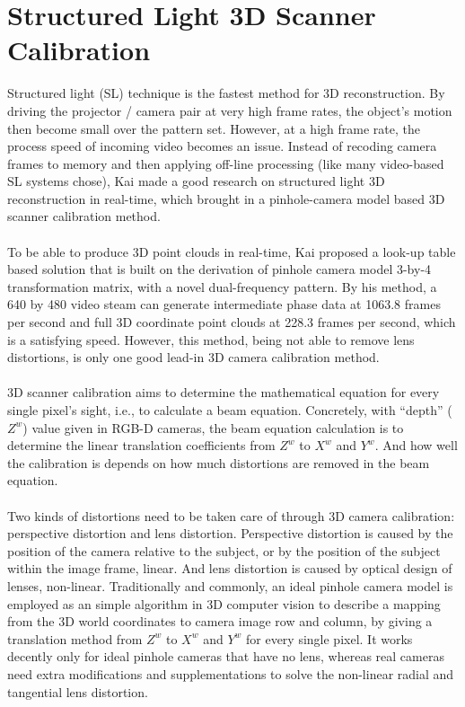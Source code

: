 \section{Structured Light 3D Scanner Calibration} %
\label{sectionSL3DCalibration} %
Structured light (SL) technique is the fastest method for 3D reconstruction. By driving the projector / camera pair at very high frame rates, the object's motion then become small over the pattern set. However, at a high frame rate, the process speed of incoming video becomes an issue. Instead of recoding camera frames to memory and then applying off-line processing (like many video-based SL systems chose), Kai \cite{Kai10} made a good research on structured light 3D reconstruction in real-time, which brought in a pinhole-camera model based 3D scanner calibration method. %
\\\\%
To be able to produce 3D point clouds in real-time, Kai proposed a look-up table based solution that is built on the derivation of pinhole camera model 3-by-4 transformation matrix, with a novel dual-frequency pattern. By his method, a 640 by 480 video steam can generate intermediate phase data at 1063.8 frames per second and full 3D coordinate point clouds at 228.3 frames per second, which is a satisfying speed. However, this method, being not able to remove lens distortions, is only one good lead-in 3D camera calibration method.%
\\\\%
3D scanner calibration aims to determine the mathematical equation for every single pixel's sight, i.e., to calculate a beam equation. Concretely, with \enquote{depth} (\(Z^{w}\)) value given in RGB-D cameras, the beam equation calculation is to determine the linear translation coefficients from \(Z^{w}\) to \(X^{w}\) and \(Y^{w}\). And how well the calibration is depends on how much distortions are removed in the beam equation.%
\\\\%
Two kinds of distortions need to be taken care of through 3D camera calibration: perspective distortion and lens distortion. Perspective distortion is caused by the position of the camera relative to the subject, or by the position of the subject within the image frame, linear. And lens distortion is caused by optical design of lenses, non-linear. Traditionally and commonly, an ideal pinhole camera model is employed as an simple algorithm in 3D computer vision to describe a mapping from the 3D world coordinates to camera image row and column, by giving a translation method from \(Z^{w}\) to \(X^{w}\)  and \(Y^{w}\)  for every single pixel. It works decently only for ideal pinhole cameras that have no lens, whereas real cameras need extra modifications and supplementations to solve the non-linear radial and tangential lens distortion.%
